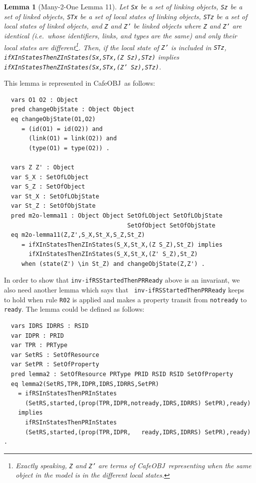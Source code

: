 \documentclass[12pt]{report}
\newtheorem{lemma}{Lemma}
\newcommand{\stt}[1]{{\small{\tt {#1}}}}
\newcommand{\cafeobj}{{\sf CafeOBJ}~}
\begin{document}
\begin{lemma}[Many-2-One Lemma 11]
  Let {\tt Sx} be a set of linking objects, {\tt Sz} be a set of
  linked objects, {\tt STx} be a set of local states of linking
  objects, {\tt STz} be a set of local states of linked objects, and
  {\tt Z} and {\tt Z'} be linked objects where {\tt Z} and {\tt Z'}
  are identical (i.e.\ whose identifiers, links, and types are the
  same) and only their local states are different\footnote{Exactly
    speaking, {\tt Z} and {\tt Z'} are terms of \cafeobj representing
    when the same object in the model is in the different local
    states.}.  Then, if the local state of {\tt Z'} is included in
  {\tt STz}, \stt{ifXInStatesThenZInStates(Sx,STx,(Z Sz),STz)}
  implies\\ \stt{ifXInStatesThenZInStates(Sx,STx,(Z' Sz),STz)}.
\end{lemma}
This lemma is represented in \cafeobj as follows:
\begin{verbatim}
  vars O1 O2 : Object
  pred changeObjState : Object Object
  eq changeObjState(O1,O2)
     = (id(O1) = id(O2)) and 
       (link(O1) = link(O2)) and
       (type(O1) = type(O2)) .

  vars Z Z' : Object
  var S_X : SetOfLObject
  var S_Z : SetOfObject
  var St_X : SetOfLObjState
  var St_Z : SetOfObjState
  pred m2o-lemma11 : Object Object SetOfLObject SetOfLObjState
                                   SetOfObject SetOfObjState
  eq m2o-lemma11(Z,Z',S_X,St_X,S_Z,St_Z)
     = ifXInStatesThenZInStates(S_X,St_X,(Z S_Z),St_Z) implies
       ifXInStatesThenZInStates(S_X,St_X,(Z' S_Z),St_Z) 
     when (state(Z') \in St_Z) and changeObjState(Z,Z') .
\end{verbatim}
In order to show that {\tt inv-ifRSStartedThenPRReady} above is an
invariant, we also need another lemma which says that {\tt
  inv-ifRSStartedThenPRReady} keeps to hold when rule {\tt R02} is
applied and makes a property transit from {\tt notready} to {\tt
  ready}.  The lemma could be defined as follows:
\begin{verbatim}
  vars IDRS IDRRS : RSID 
  var IDPR : PRID
  var TPR : PRType
  var SetRS : SetOfResource
  var SetPR : SetOfProperty
  pred lemma2 : SetOfResource PRType PRID RSID RSID SetOfProperty
  eq lemma2(SetRS,TPR,IDPR,IDRS,IDRRS,SetPR)
    = ifRSInStatesThenPRInStates
      (SetRS,started,(prop(TPR,IDPR,notready,IDRS,IDRRS) SetPR),ready)
    implies
      ifRSInStatesThenPRInStates
      (SetRS,started,(prop(TPR,IDPR,   ready,IDRS,IDRRS) SetPR),ready) .
\end{verbatim}
\end{document}
